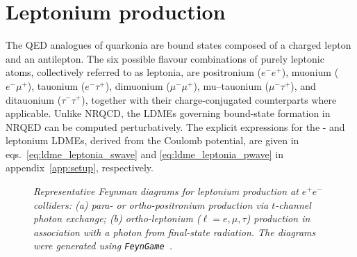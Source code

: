 \section{Leptonium production}
\label{sec:leptionium}

The QED analogues of quarkonia are bound states composed of a charged lepton and an antilepton. The six possible flavour combinations of purely leptonic atoms, collectively referred to as leptonia, are positronium ($e^-e^+$), muonium ($e^{-}\mu^{+}$), tauonium ($e^{-}\tau^{+}$), dimuonium ($\mu^-\mu^+$), mu--tauonium ($\mu^{-}\tau^{+}$), and ditauonium ($\tau^-\tau^+$), together with their charge-conjugated counterparts where applicable. Unlike NRQCD, the LDMEs governing bound-state formation in NRQED can be computed perturbatively. The explicit expressions for the \swave- and {\pwavetxt} leptonium LDMEs, derived from the Coulomb potential, are given in eqs.~\eqref{eq:ldme_leptonia_swave} and \eqref{eq:ldme_leptonia_pwave} in appendix~\ref{app:setup}, respectively.

\begin{figure}[t]
    \centering
    \begin{subfigure}[b]{\textwidth}
        \centering
        \def\svgwidth{0.4\textwidth}
        
        \def\svgwidth{0.4\textwidth}
        
        \caption{}\label{fig:diag_leptonium_a}
    \end{subfigure}
    \begin{subfigure}[b]{0.4\textwidth}
        \centering
        \def\svgwidth{\textwidth}
        
        \caption{}\label{fig:diag_leptonium_b}
    \end{subfigure}
    \caption{\it\small {Representative Feynman diagrams for leptonium production at $e^+e^-$ colliders: (a) para- or ortho-positronium production via $t$-channel photon exchange; (b) ortho-leptonium ($\ell=e,\mu,\tau$) production in association with a photon from final-state radiation. The diagrams were generated using {\tt FeynGame}~\cite{feyngame,feyngame2,feyngame3}.}}
    \label{fig:diag_leptonium}
\end{figure}

